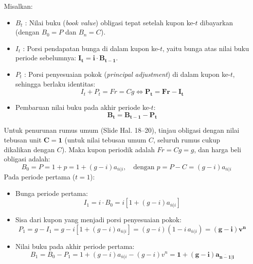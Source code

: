 \documentclass[11pt,a4paper]{article}
\begin{document}
Misalkan:
\begin{itemize}
    \item $B_t$ : Nilai buku (\textit{book value}) obligasi tepat setelah kupon ke-$t$ dibayarkan (dengan $B_0 = P$ dan $B_n = C$).
    \item $I_t$ : Porsi pendapatan bunga di dalam kupon ke-$t$, yaitu bunga atas nilai buku periode sebelumnya: $\mathbf{I_t = i \cdot B_{t-1}}$.
    \item $P_t$ : Porsi penyesuaian pokok (\textit{principal adjustment}) di dalam kupon ke-$t$, sehingga berlaku identitas:
    \begin{equation}
        I_t + P_t = Fr = Cg \iff \mathbf{P_t = Fr - I_t}
    \end{equation}
    \item Pembaruan nilai buku pada akhir periode ke-$t$:
    \begin{equation}
        \mathbf{B_t = B_{t-1} - P_t}
    \end{equation}
\end{itemize}

Untuk penurunan rumus umum (Slide Hal. 18--20), tinjau obligasi dengan nilai tebusan unit $\mathbf{C = 1}$ (untuk nilai tebusan umum $C$, seluruh rumus cukup dikalikan dengan $C$). Maka kupon periodik adalah $Fr = Cg = g$, dan harga beli obligasi adalah:
\begin{equation}
    B_0 = P = 1 + p = 1 + (g - i) a_{\overline{n}|i}, \quad \text{dengan } p = P - C = (g - i)a_{\overline{n}|i}
\end{equation}
Pada periode pertama ($t=1$):
\begin{itemize}
    \item Bunga periode pertama:
    \begin{equation*}
        I_1 = i \cdot B_0 = i \left[ 1 + (g - i) a_{\overline{n}|i} \right]
    \end{equation*}
    \item Sisa dari kupon yang menjadi porsi penyesuaian pokok:
    \begin{equation*}
        P_1 = g - I_1 = g - i \left[ 1 + (g - i) a_{\overline{n}|i} \right] = (g - i)(1 - i \, a_{\overline{n}|i}) = \mathbf{(g - i) v^n}
    \end{equation*}
    \item Nilai buku pada akhir periode pertama:
    \begin{equation*}
        B_1 = B_0 - P_1 = 1 + (g - i) a_{\overline{n}|i} - (g - i) v^n = \mathbf{1 + (g - i) a_{\overline{n-1}|i}}
    \end{equation*}
\end{itemize}
\end{document}
